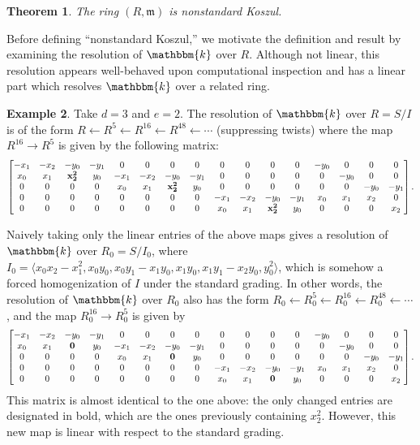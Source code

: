 \documentclass[12pt,reqno]{amsart}
\newtheorem{theorem}{Theorem}[section]
\theoremstyle{definition}
\newtheorem{example}[theorem]{Example}
\theoremstyle{remark}
\newcommand{\bbk}{\mathbbm{k}}
\newcommand{\frakm}{{\mathfrak{m}}}
\newcommand{\ideal}[1]{{\langle #1 \rangle}}
\begin{document}
\begin{theorem}
\label{thm:Koszul}
The ring $(R,\frakm)$ is nonstandard Koszul.
\end{theorem}

Before defining ``nonstandard Koszul,'' we motivate the definition and result by examining the resolution of $\bbk$ over $R$.  Although not linear, this resolution appears well-behaved upon computational inspection and has a linear part which resolves $\bbk$ over a related ring. 

\begin{example} 

Take $d=3$ and $e=2$. The resolution of $\bbk$ over $R = S/I$ is of the form $R \leftarrow R^5 \leftarrow R^{16} \leftarrow R^{48} \leftarrow \cdots$ (suppressing twists) where the map $R^{16} \rightarrow R^5$ is given by the following matrix:
$$
\setcounter{MaxMatrixCols}{20}
\begin{bmatrix}
-x_1 & -x_2 & -y_0 & -y_1 & 0 & 0 & 0 & 0 & 0&0&0&0 & -y_0 & 0 & 0 & 0\\
x_0 & x_1 & \mathbf{x_2^2} & y_0 & -x_1 & -x_2 & -y_0 & -y_1 & 0&0&0&0& 0 & -y_0 & 0 & 0 \\
0&0&0&0 & x_0 & x_1 & \mathbf{x_2^2} & y_0 & 0&0&0&0 & 0&0& -y_0 & -y_1\\
0&0&0&0&0&0&0&0  & -x_1 & -x_2 & -y_0 & -y_1 & x_0 & x_1 & x_2 &0\\
0&0&0&0&0&0&0&0 & x_0 & x_1 & \mathbf{x_2^2} & y_0 & 0 & 0 & 0 & x_2
\end{bmatrix}.
$$ 

Naively taking only the linear entries of the above maps gives a resolution of $\bbk$ over $R_0 = S/I_0$, where $I_0 = \ideal{x_0x_2-x_1^2, x_0y_0, x_0y_1 - x_1y_0, x_1y_0, x_1y_1 - x_2y_0, y_0^2}$, which is somehow a forced homogenization of $I$ under the standard grading.  
In other words, the resolution of $\bbk$ over $R_0$ also has the form $R_0 \leftarrow R_0^5 \leftarrow R_0^{16} \leftarrow R_0^{48} \leftarrow \cdots$, and the map $R_0^{16} \rightarrow R_0^5$ is given by
$$
\setcounter{MaxMatrixCols}{20}
\begin{bmatrix}
-x_1 & -x_2 & -y_0 & -y_1 & 0 & 0 & 0 & 0 & 0&0&0&0 & -y_0 & 0 & 0 & 0\\
x_0 & x_1 & \mathbf{0} & y_0 & -x_1 & -x_2 & -y_0 & -y_1 & 0&0&0&0& 0 & -y_0 & 0 & 0 \\
0&0&0&0 & x_0 & x_1 & \mathbf{0} & y_0 & 0&0&0&0 & 0&0& -y_0 & -y_1\\
0&0&0&0&0&0&0&0  & -x_1 & -x_2 & -y_0 & -y_1 & x_0 & x_1 & x_2 &0\\
0&0&0&0&0&0&0&0 & x_0 & x_1 & \mathbf{0} & y_0 & 0 & 0 & 0 & x_2
\end{bmatrix}.
$$
This matrix is almost identical to the one above: the only changed entries are designated in bold, which are the ones previously containing $x_2^2$.
However, this new map is linear with respect to the standard grading.
\end{example}
\end{document}
